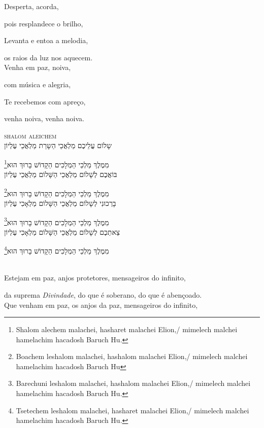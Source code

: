Desperta, acorda,

pois resplandece o brilho,

Levanta e entoa a melodia,

os raios da luz nos aquecem.\\[10pt]

Venha em paz, noiva,

com música e alegria,

Te recebemos com apreço,

venha noiva, venha noiva.

\movetoevenpage
\raggedleft

\textsc{shalom aleichem}\\[15pt]

שָלוֹם עֲלֵיכֶם מַלְאֲכֵי הַשָרֵת מַלְאֲכֵי עֶלְיוֹן

מִמֶלֶךְ מַלְכֵי הַמְלָכִים הַקָדוֹשׁ בָרוּךְ הוּא\footnote{Shalom alechem malachei, hasharet malachei Elion,/
mimelech malchei hamelachim hacadosh Baruch Hu.}\\[10pt]

בּוֹאֲכֶם לְשָׁלוֹם מַלְאֲכֵי הַשָּׁלוֹם מַלְאֲכֵי עֶלְיוֹן

מִמֶלֶךְ מַלְכֵי הַמְלָכִים הַקָדוֹשׁ בָרוּךְ הוּא\footnote{Boachem leshalom malachei, hashalom malachei Elion,/
mimelech malchei hamelachim hacadosh Baruch Hu}\\[10pt]

בָרְכוּנִי לְשָלוֹם מַלְאֲכֵי הַשָּׁלוֹם מַלְאָכִי עֶלְיוֹן

מִמֶלֶךְ מַלְכֵי הַמְלָכִים הַקָדוֹשׁ בָרוּךְ הוּא\footnote{Barechuni leshalom malachei, hashalom malachei Elion,/
mimelech malchei hamelachim hacadosh Baruch Hu.}\\[10pt]

צֵאתְכֶם לְשָלוֹם מַלְאֲכֵי הַשָּׁלוֹם מַלְאָכִי עֶלְיוֹן

מִמֶלֶךְ מַלְכֵי הַמְלָכִים הַקָדוֹשׁ בָרוּךְ הוּא\footnote{Tsetechem leshalom malachei, hasharet malachei Elion,/
mimelech malchei hamelachim hacadosh Baruch Hu.}

\movetooddpage
\raggedright

\textsc{}\\[15pt]

Estejam em paz, anjos protetores, mensageiros do infinito,

da suprema \emph{Divindade},  do que é soberano, do que é abençoado.\\[10pt]

Que venham em paz, os anjos da paz, mensageiros do infinito,

